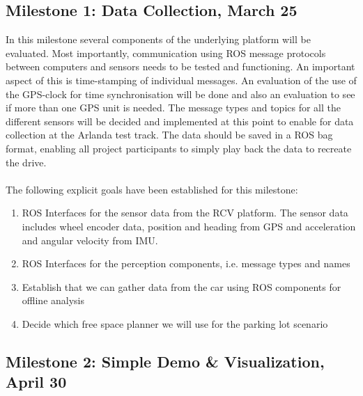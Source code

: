 \documentclass[11pt,a4paper]{article}
\begin{document}
\subsection{Milestone 1: Data Collection, March 25}
\label{milestone1}

In this milestone several components of the underlying platform will be evaluated.
Most importantly, communication using ROS message protocols between computers and sensors needs to be tested and functioning.
An important aspect of this is time-stamping
of individual messages. An evaluation of the use of the GPS-clock for time synchronisation will be done and also an evaluation to see if more than one GPS unit is needed.
The message types and topics for all the different sensors
will be decided and implemented at this point to enable for data collection at the Arlanda test track. The data should be saved in a ROS bag format, enabling
all project participants to simply play back the data to recreate the drive. \\ \\
The following explicit goals have been established for this milestone:
\begin{enumerate}
\item ROS Interfaces for the sensor data from the RCV platform. The sensor data includes wheel encoder data, position and heading from GPS and acceleration and angular velocity from IMU.
\item ROS Interfaces for the perception components, i.e. message types and names
\item Establish that we can gather data from the car using ROS components for offline analysis
\item Decide which free space planner we will use for the parking lot scenario
\end{enumerate}

\subsection{Milestone 2: Simple Demo \& Visualization, April 30}
\label{milestone2}
\end{document}
